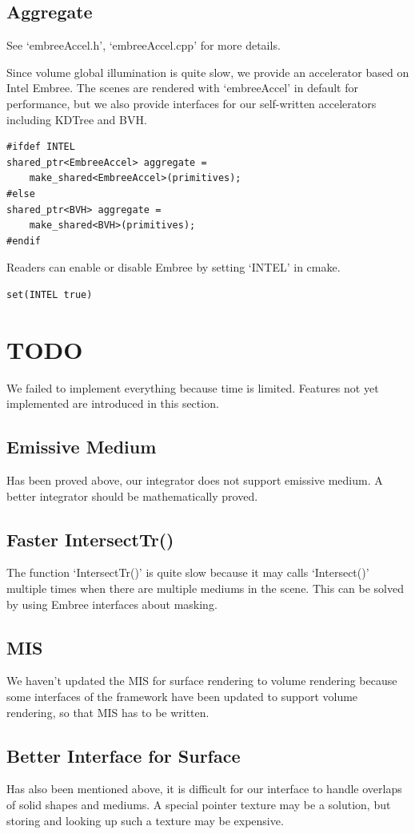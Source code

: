 \documentclass[acmtog]{acmart}
\begin{document}
\subsection{Aggregate}
    See `embreeAccel.h', `embreeAccel.cpp' for more details.\par
    Since volume global illumination is quite slow, we provide an accelerator based on Intel Embree.
    The scenes are rendered with `embreeAccel' in default for performance, 
    but we also provide interfaces for our self-written accelerators including KDTree and BVH.
\begin{lstlisting}
#ifdef INTEL
shared_ptr<EmbreeAccel> aggregate = 
    make_shared<EmbreeAccel>(primitives);
#else
shared_ptr<BVH> aggregate = 
    make_shared<BVH>(primitives);
#endif
\end{lstlisting}
    Readers can enable or disable Embree by setting `INTEL' in cmake.
\begin{lstlisting}
set(INTEL true)
\end{lstlisting}

\section{TODO}
    We failed to implement everything because time is limited.
    Features not yet implemented are introduced in this section.
\subsection{Emissive Medium}
    Has been proved above, our integrator does not support emissive medium.
    A better integrator should be mathematically proved.
\subsection{Faster IntersectTr()}
    The function `IntersectTr()' is quite slow because it may calls `Intersect()' multiple times when there are multiple mediums in the scene.
    This can be solved by using Embree interfaces about masking.
\subsection{MIS}
    We haven't updated the MIS for surface rendering to volume rendering because
    some interfaces of the framework have been updated to support volume rendering, 
    so that MIS has to be written.
\subsection{Better Interface for Surface}
    Has also been mentioned above, it is difficult for our interface to handle overlaps of solid shapes and mediums.
    A special pointer texture may be a solution, but storing and looking up such a texture may be expensive.
\end{document}
